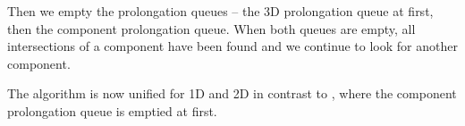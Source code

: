 \documentclass{elsarticle}
\begin{document}
Then we empty the prolongation queues -- the 3D prolongation queue at first, then the component prolongation queue.
When both queues are empty, all intersections of a component have been found and we continue to look for
another component.

The algorithm is now unified for 1D and 2D in contrast to \cite{fris_dp_2015}, where the component prolongation
queue is emptied at first.


\end{document}
